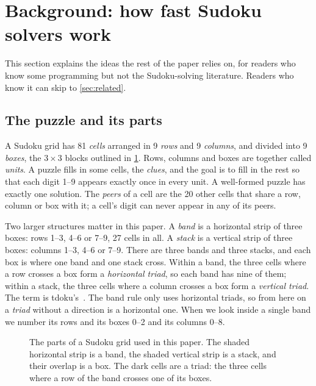 \documentclass[11pt]{article}
\theoremstyle{definition}
\theoremstyle{plain}
\begin{document}
\section{Background: how fast Sudoku solvers work}
\label{sec:terms}

This section explains the ideas the rest of the paper relies on, for readers who know some programming but not the
Sudoku-solving literature. Readers who know it can skip to \cref{sec:related}.

\subsection{The puzzle and its parts}

A Sudoku grid has 81 \emph{cells} arranged in 9 \emph{rows} and 9 \emph{columns}, and divided into 9 \emph{boxes}, the
$3\times 3$ blocks outlined in \cref{fig:grid}. Rows, columns and boxes are together called \emph{units}. A puzzle
fills in some cells, the \emph{clues}, and the goal is to fill in the rest so that each digit 1--9 appears exactly
once in every unit. A well-formed puzzle has exactly one solution. The \emph{peers} of a cell are the 20 other cells
that share a row, column or box with it; a cell's digit can never appear in any of its peers.

Two larger structures matter in this paper. A \emph{band} is a horizontal strip of three boxes: rows 1--3, 4--6 or
7--9, 27 cells in all. A \emph{stack} is a vertical strip of three boxes: columns 1--3, 4--6 or 7--9. There are three
bands and three stacks, and each box is where one band and one stack cross. Within a band, the three cells where a row
crosses a box form a \emph{horizontal triad}, so each band has nine of them; within a stack, the three cells where a
column crosses a box form a \emph{vertical triad}. The term is tdoku's~\cite{dillon2019nerdsniped}. The band rule only
uses horizontal triads, so from here on a \emph{triad} without a direction is a horizontal one. When
we look inside a single band we number its rows and its boxes 0--2 and its columns 0--8.

\begin{figure}[t]
\centering
{}
\caption{The parts of a Sudoku grid used in this paper. The shaded horizontal strip is a band, the shaded vertical
strip is a stack, and their overlap is a box. The dark cells are a triad: the three cells where a row of the band
crosses one of its boxes.}
\label{fig:grid}
\end{figure}
\end{document}
